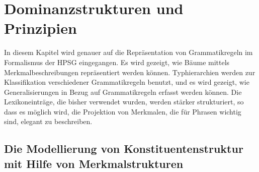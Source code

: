 

\chapter{Dominanzstrukturen und Prinzipien}
\label{Kapitel-komplementation}

In diesem Kapitel wird genauer auf die Repräsentation von Grammatikregeln
im Formalismus der HPSG eingegangen. Es wird gezeigt, wie Bäume mittels Merkmalbeschreibungen
repräsentiert werden können. Typhierarchien werden zur Klassifikation verschiedener
Grammatikregeln benutzt, und es wird gezeigt, wie Generalisierungen in Bezug
auf Grammatikregeln erfasst werden können. Die Lexikoneinträge, die bisher verwendet wurden,
werden stärker strukturiert, so dass es möglich wird, die Projektion
von Merkmalen, die für Phrasen wichtig sind, elegant zu beschreiben. 

\section{Die Modellierung von Konstituentenstruktur mit Hilfe von Merkmalstrukturen}

